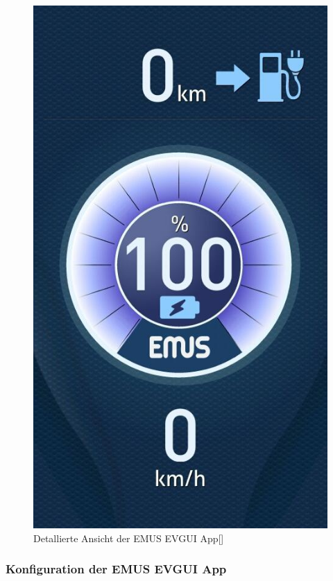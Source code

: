 \begin{figure}[H]
	\begin{center}
		\includegraphics[scale=0.4]{figures/Akku/EMUSAPP2.jpg}
		\caption{Detallierte Ansicht der EMUS EVGUI App[\cite{DetaillierteApp}]}
		\label{fig: Detallierte Ansicht der EMUS EVGUI App}
	\end{center}
\end{figure}
\newpage

\subsubsection{Konfiguration der EMUS EVGUI App}

